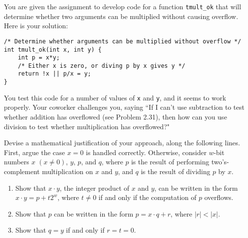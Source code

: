 \documentclass[12pt]{article}
\newenvironment{ex}[2][Exercise]{\begin{trivlist}
		\item[\hskip \labelsep {\bfseries #1}\hskip \labelsep {\bfseries #2.}]}{\end{trivlist}}
\begin{document}
\begin{ex}{2.35}
	You are given the assignment to develop code for a function \texttt{tmult\_ok}
	that will determine whether two arguments can be multiplied without causing
	overflow. Here is your solution:
	
	\begin{lstlisting}
/* Determine whether arguments can be multiplied without overflow */
int tmult_ok(int x, int y) {
	int p = x*y;
	/* Either x is zero, or diving p by x gives y */
	return !x || p/x = y;
}
	\end{lstlisting}
	You test this code for a number of values of \texttt{x} and \texttt{y}, and it
	seems to work properly. Your coworker challenges you, saying ``If I can't use
	subtraction to test whether addition has overflowed (see Problem 2.31), then how
	can you  use division to test whether multiplication has overflowed?"
	
	Devise a mathematical justification of your approach, along the following lines.
	First, argue the case $x=0$ is handled correctly. Otherwise, consider
	$w$-bit numbers $x$ $(x\neq 0)$, $y$, $p$, and $q$, where $p$ is the result of
	performing two's-complement multiplication on $x$ and $y$, and $q$ is the
	result of dividing $p$ by $x$.
	\begin{enumerate}
		\item Show that $x\cdot y$, the integer product of $x$ and $y$, can be written
		in the form $x\cdot y=p+t2^w$, where $t\neq 0$ if and only if the computation
		of $p$ overflows.
		\item Show that $p$ can be written in the form $p=x\cdot q+r$, where $|r|<|x|$.
		\item Show that $q=y$ if and only if $r=t=0$.
	\end{enumerate}
\end{ex}
\end{document}
